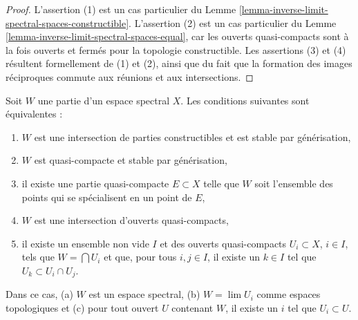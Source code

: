 \begin{proof}
L'assertion (1) est un cas particulier du
Lemme \ref{lemma-inverse-limit-spectral-spaces-constructible}.
L'assertion (2) est un cas particulier du
Lemme \ref{lemma-inverse-limit-spectral-spaces-equal},
car les ouverts quasi-compacts sont à la fois ouverts et fermés pour la
topologie constructible. Les assertions (3) et (4) résultent formellement de
(1) et (2), ainsi que du fait que la formation des images réciproques
commute aux réunions et aux intersections.
\end{proof}

\begin{lemma}
\label{lemma-make-spectral-space}
Soit $W$ une partie d'un espace spectral $X$. Les conditions suivantes sont
équivalentes :
\begin{enumerate}
\item $W$ est une intersection de parties constructibles et est stable par
générisation,
\item $W$ est quasi-compacte et stable par générisation,
\item il existe une partie quasi-compacte $E \subset X$ telle que
$W$ soit l'ensemble des points qui se spécialisent en un point de $E$,
\item $W$ est une intersection d'ouverts quasi-compacts,
\item
\label{item-intersection-quasi-compact-open}
il existe un ensemble non vide $I$ et des ouverts quasi-compacts
$U_i \subset X$, $i \in I$,
tels que $W = \bigcap U_i$ et que, pour tous $i, j \in I$, il existe un
$k \in I$ tel que $U_k \subset U_i \cap U_j$.
\end{enumerate}
Dans ce cas, (a) $W$ est un espace spectral, (b) $W = \lim U_i$
comme espaces topologiques et (c) pour tout ouvert $U$ contenant $W$,
il existe un $i$ tel que $U_i \subset U$.
\end{lemma}

